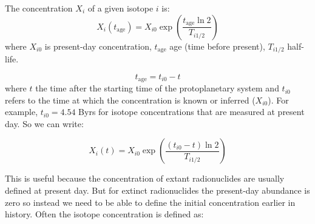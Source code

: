 The concentration $X_i$ of a given isotope $i$ is:
\cite[Eq.~4.7,][]{TS14}
\begin{equation}
X_i(t_\mathrm{age})= X_{i0} \exp{\left( \frac{t_\mathrm{age} \ln2}{T_{i1/2}} \right)}
\end{equation}
where $X_{i0}$ is present-day concentration, $t_\mathrm{age}$ age (time before present), $T_{i1/2}$ half-life.

\begin{equation}
t_\mathrm{age} = t_{i0} - t
\end{equation}
where $t$ the time after the starting time of the protoplanetary system and $t_{i0}$ refers to the time at which the concentration is known or inferred ($X_{i0}$).  For example, $t_{i0}=4.54$ Byrs for isotope concentrations that are measured at present day.  So we can write:

\begin{equation}
X_i(t) = X_{i0} \exp{\left( \frac{(t_{i0}-t) \ln2}{T_{i1/2}} \right)}
\end{equation}

This is useful because the concentration of extant radionuclides are usually defined at present day.  But for extinct radionuclides the present-day abundance is zero so instead we need to be able to define the initial concentration earlier in history.  Often the isotope concentration is defined as:

